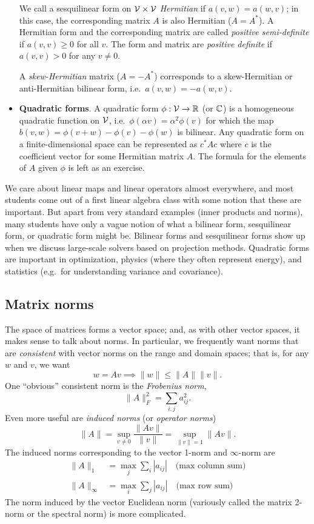 \documentclass[12pt, leqno]{article}
\begin{document}
\begin{itemize}
  We call a sesquilinear form on $\mathcal{V} \times \mathcal{V}$ {\em Hermitian} if
  $a(v,w) = a(w,v)$; in this case, the corresponding matrix $A$ is
  also Hermitian ($A = A^*$).  A Hermitian form and the corresponding
  matrix are called {\em positive semi-definite} if $a(v,v) \geq 0$
  for all $v$.  The form and matrix are {\em positive definite} if
  $a(v,v) > 0$ for any $v \neq 0$.

  A {\em skew-Hermitian} matrix
  ($A = -A^*$) corresponds to a skew-Hermitian or anti-Hermitian bilinear
  form, i.e.~$a(v,w) = -a(w,v)$.
\item {\bf Quadratic forms}.  A quadratic form $\phi : \mathcal{V}
  \rightarrow \mathbb{R}$ (or $\mathbb{C}$) is a homogeneous quadratic function
  on $\mathcal{V}$, i.e.~$\phi(\alpha v) = \alpha^2 \phi(v)$ for which the
  map $b(v,w) = \phi(v+w) - \phi(v) - \phi(w)$ is bilinear.
  Any quadratic form on a finite-dimensional space can be
  represented as $c^* A c$ where $c$ is the coefficient vector for
  some Hermitian matrix $A$.  The formula for the elements of $A$
  given $\phi$ is left as an exercise.
\end{itemize}
We care about linear maps and linear operators almost everywhere, and
most students come out of a first linear algebra class with some
notion that these are important.  But apart from very standard
examples (inner products and norms), many students have only a vague
notion of what a bilinear form, sesquilinear form, or quadratic form
might be.  Bilinear forms and sesquilinear forms show up when we
discuss large-scale solvers based on projection methods.  Quadratic
forms are important in optimization, physics (where they often
represent energy), and statistics (e.g.~for understanding variance and
covariance).

\subsection{Matrix norms}

The space of matrices forms a vector space; and, as with other vector
spaces, it makes sense to talk about norms.  In particular, we
frequently want norms that are {\em consistent} with vector norms
on the range and domain spaces; that is, for any $w$ and $v$,
we want
\[
  w = Av \implies \|w\| \leq \|A\| \|v\|.
\]
One ``obvious'' consistent norm is the {\em Frobenius norm},
\[
  \|A\|_F^2 = \sum_{i,j} a_{ij}^2.
\]
Even more useful are {\em induced norms} (or {\em operator norms})
\[
  \|A\| = \sup_{v \neq 0} \frac{\|Av\|}{\|v\|} = \sup_{\|v\|=1} \|Av\|.
\]
The induced norms corresponding to the vector 1-norm and $\infty$-norm
are
\begin{align*}
  \|A\|_1 &= \max_j \sum_i |a_{ij}| \quad \mbox{(max column sum)}\\
  \|A\|_\infty &= \max_i \sum_j |a_{ij}| \quad \mbox{(max row sum)}
\end{align*}
The norm induced by the vector Euclidean norm (variously called
the matrix 2-norm or the spectral norm) is more complicated.
\end{document}
